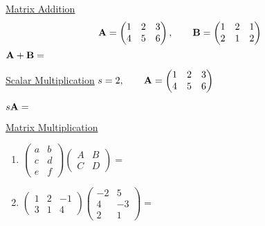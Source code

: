 \documentclass[
]{article}
\begin{document}
\begin{example}
\underline{Matrix Addition}
\protect\hypertarget{exm:matrixaddition}{}\label{exm:matrixaddition}\[{\bf A}=\begin{pmatrix} 1 & 2 & 3 \\ 4 & 5 & 6 \end{pmatrix}, \qquad
            {\bf B}=\begin{pmatrix} 1 & 2 & 1 \\ 2 & 1 & 2 \end{pmatrix}\]
\({\bf A+B}=\)

\underline{Scalar Multiplication}
\protect\hypertarget{exm:scalarmulti}{}\label{exm:scalarmulti}\(s=2, \qquad {\bf A}=\begin{pmatrix} 1 & 2 & 3 \\ 4 & 5 & 6 \end{pmatrix}\)

\(s {\bf A} =\)

\underline{Matrix Multiplication}
\begin{enumerate}
\def\labelenumi{\arabic{enumi}.}
\item
  \(\begin{pmatrix} a&b\\c&d\\e&f \end{pmatrix} \begin{pmatrix} A&B\\C&D \end{pmatrix}  =\)
\item
  \(\begin{pmatrix} 1&2&-1\\3&1&4 \end{pmatrix} \begin{pmatrix} -2&5\\4&-3\\2&1\end{pmatrix} =\)
\end{enumerate}
\end{example}
\end{document}
